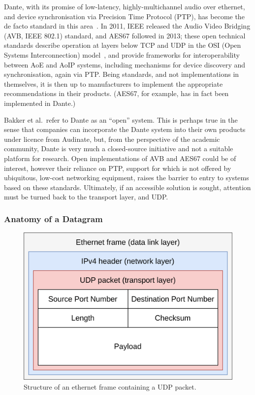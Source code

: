 Dante, with its promise of low-latency, highly-multichannel audio over ethernet,
and device synchronisation via Precision Time Protocol (PTP), has become the de
facto standard in this area~\citep{bakker_introduction_2014}.
In 2011, IEEE released the Audio Video Bridging (AVB, IEEE 802.1) standard,
and AES67 followed in 2013; these open technical standards describe operation
at layers below TCP and UDP in the OSI (Open Systems Interconnection)
model~\citep{}, and
provide frameworks for interoperability between AoE and AoIP systems, including
mechanisms for device discovery and synchronisation, again via PTP\@.
Being standards, and not implementations in themselves, it is then up to
manufacturers to implement the appropriate recommendations in their products.
(AES67, for example, has in fact been implemented in Dante.)

Bakker et al.\ refer to Dante as an ``open'' system.
This is perhaps true in the sense that companies can incorporate the Dante
system into their own products under licence from Audinate, but, from the
perspective of the academic community, Dante is very much a closed-source
initiative and not a suitable platform for research.
Open implementations of AVB and AES67 could be of interest, however their
reliance on PTP, support for which is not offered by ubiquitous, low-cost
networking equipment, raises the barrier to entry to systems based on these
standards.
Ultimately, if an accessible solution is sought, attention must be turned back
to the transport layer, and UDP\@.


\subsubsection{Anatomy of a Datagram}\label{subsubsec:anatomy-of-a-datagram}

\begin{figure}[h]
    \centering
    \includegraphics[width=.5\textwidth]{figures/udp}
    \caption{Structure of an ethernet frame containing a UDP packet.}
    \label{fig:udp-frame}
\end{figure}


